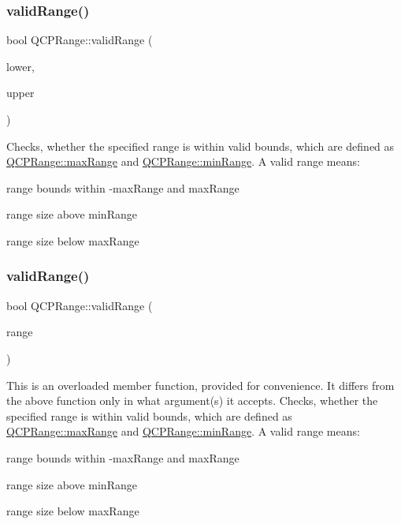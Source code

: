 \subsubsection{\texorpdfstring{valid\+Range()}{validRange()}\hspace{0.1cm}{\footnotesize\ttfamily [1/2]}}
{\footnotesize\ttfamily bool Q\+C\+P\+Range\+::valid\+Range (\begin{DoxyParamCaption}\item[{double}]{lower,  }\item[{double}]{upper }\end{DoxyParamCaption})\hspace{0.3cm}{\ttfamily [static]}}

Checks, whether the specified range is within valid bounds, which are defined as \hyperlink{class_q_c_p_range_a5ca51e7a2dc5dc0d49527ab171fe1f4f}{Q\+C\+P\+Range\+::max\+Range} and \hyperlink{class_q_c_p_range_ab46d3bc95030ee25efda41b89e2b616b}{Q\+C\+P\+Range\+::min\+Range}. A valid range means\+: \begin{DoxyItemize}
\item range bounds within -\/max\+Range and max\+Range \item range size above min\+Range \item range size below max\+Range \end{DoxyItemize}
\hypertarget{class_q_c_p_range_a801b964752eaad6219be9d8a651ec2b3}{}\label{class_q_c_p_range_a801b964752eaad6219be9d8a651ec2b3} 
\subsubsection{\texorpdfstring{valid\+Range()}{validRange()}\hspace{0.1cm}{\footnotesize\ttfamily [2/2]}}
{\footnotesize\ttfamily bool Q\+C\+P\+Range\+::valid\+Range (\begin{DoxyParamCaption}\item[{const \hyperlink{class_q_c_p_range}{Q\+C\+P\+Range} \&}]{range }\end{DoxyParamCaption})\hspace{0.3cm}{\ttfamily [static]}}

This is an overloaded member function, provided for convenience. It differs from the above function only in what argument(s) it accepts. Checks, whether the specified range is within valid bounds, which are defined as \hyperlink{class_q_c_p_range_a5ca51e7a2dc5dc0d49527ab171fe1f4f}{Q\+C\+P\+Range\+::max\+Range} and \hyperlink{class_q_c_p_range_ab46d3bc95030ee25efda41b89e2b616b}{Q\+C\+P\+Range\+::min\+Range}. A valid range means\+: \begin{DoxyItemize}
\item range bounds within -\/max\+Range and max\+Range \item range size above min\+Range \item range size below max\+Range \end{DoxyItemize}


